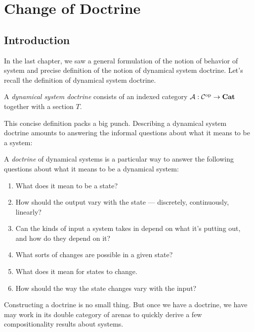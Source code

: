 \documentclass[DynamicalBook]{subfiles}
\begin{document}
%


\setcounter{chapter}{3}%


\chapter{Change of Doctrine}

\section{Introduction}

In the last chapter, we saw a general formulation of the notion of behavior of
system and precise definition of the notion of dynamical system doctrine. Let's
recall the definition of dynamical system doctrine.

\begin{definition}\label{def.doctrine}
A \emph{dynamical system doctrine} consists of an indexed category $\mathcal{A} :
\mathcal{C}^{\textnormal{op}} \to \textbf{Cat}$ together with a section $T$.
\end{definition}

This concise definition packs a big punch. Describing a dynamical system
doctrine amounts to answering the informal questions about what it means to be a
system:
\begin{informal}
  A \emph{doctrine} of dynamical systems is a particular way to answer the following
  questions about what it means to be a dynamical system:
  \begin{enumerate}
  \item What does it mean to be a state?
  \item How should the output vary with the state --- discretely,
    continuously, linearly?
  \item Can the kinds of input a
    system takes in depend on what it's putting out, and how do they depend on it?
  \item What sorts of changes are possible in a given state?
  \item What does it mean for states to change. 
  \item How should the way the state changes vary with the input?
  \end{enumerate}
\end{informal}

Constructing a doctrine is no small thing. But once we have a doctrine, we have
may work in its double category of arenas to quickly derive a few
compositionality results about systems.
\end{document}
